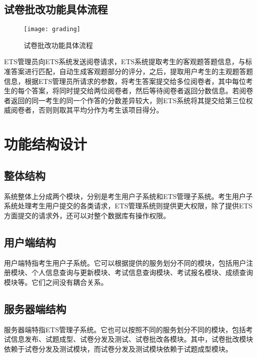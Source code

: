 \subsection{试卷批改功能具体流程}
\begin{figure}[ht]
\centering
\texttt{[image: grading]}
\caption{试卷批改功能具体流程} \label{fig:figure10}
\end{figure}

ETS管理员向ETS系统发送阅卷请求，ETS系统提取考生的客观题答题信息，与标准答案进行匹配，自动生成客观题部分的评分，之后，提取用户考生的主观题答题信息，根据ETS管理员所请求的参数，将考生答案提交给多位阅卷者，其中每位考生的每个答案，将同时提交给两位阅卷者，然后等待阅卷者返回分数信息。若阅卷者返回的同一考生的同一个作答的分数差异较大，则ETS系统将其提交给第三位权威阅卷者，否则则取其平均分作为考生该项目得分。


\section{功能结构设计}
\subsection{整体结构}
系统整体上分成两个模块，分别是考生用户子系统和ETS管理子系统。考生用户子系统处理考生用户提交的各类请求，ETS管理系统则提供更大权限，除了提供ETS方面提交的请求外，还可以对整个数据库有操作权限。

\subsection{用户端结构}
用户端特指考生用户子系统。它可以根据提供的服务划分不同的模块，包括用户注册模块、个人信息查询与更新模块、考试信息查询模块、考试报名模块、成绩查询模块等。它们之间没有耦合关系。

\subsection{服务器端结构}
服务器端特指ETS管理子系统。它也可以按照不同的服务划分不同的模块，包括考试信息发布、试题成型、试卷分发及测试、试卷批改各模块。其中，试卷批改模块依赖于试卷分发及测试模块，而试卷分发及测试模块依赖于试题成型模块。



